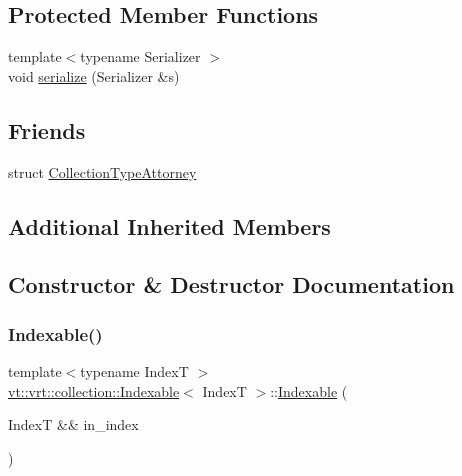 \subsection*{Protected Member Functions}
\begin{DoxyCompactItemize}
\item 
{\footnotesize template$<$typename Serializer $>$ }\\void \hyperlink{structvt_1_1vrt_1_1collection_1_1_indexable_a6c95be93183665a0d03c149207f000f9}{serialize} (Serializer \&s)
\end{DoxyCompactItemize}
\subsection*{Friends}
\begin{DoxyCompactItemize}
\item 
struct \hyperlink{structvt_1_1vrt_1_1collection_1_1_indexable_abb4eb03ec2c75b459ceec69021d22a2b}{Collection\+Type\+Attorney}
\end{DoxyCompactItemize}
\subsection*{Additional Inherited Members}


\subsection{Constructor \& Destructor Documentation}
\mbox{\label{structvt_1_1vrt_1_1collection_1_1_indexable_ad3f327a35771a31ec63241b9be57569c}} 
\subsubsection{\texorpdfstring{Indexable()}{Indexable()}\hspace{0.1cm}{\footnotesize\ttfamily [1/2]}}
{\footnotesize\ttfamily template$<$typename IndexT $>$ \\
\hyperlink{structvt_1_1vrt_1_1collection_1_1_indexable}{vt\+::vrt\+::collection\+::\+Indexable}$<$ IndexT $>$\+::\hyperlink{structvt_1_1vrt_1_1collection_1_1_indexable}{Indexable} (\begin{DoxyParamCaption}\item[{IndexT \&\&}]{in\+\_\+index }\end{DoxyParamCaption})\hspace{0.3cm}{\ttfamily [explicit]}}

